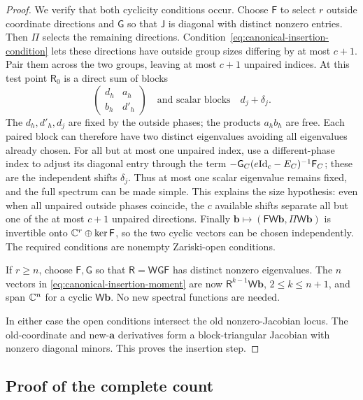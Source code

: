 \begin{proof}
We verify that both cyclicity conditions occur. Choose $\mathsf F$ to select
$r$ outside coordinate directions and $\mathsf G$ so that $\mathsf J$ is diagonal
with distinct nonzero entries. Then $\Pi$ selects the remaining
directions. Condition~\eqref{eq:canonical-insertion-condition} lets
these directions have outside group sizes differing by at most $c+1$.
Pair them across the two groups, leaving at most $c+1$ unpaired
indices. At this test point $\mathsf R_0$ is a direct sum of blocks
\[
 \begin{pmatrix}d_h&a_h\\b_h&d'_h\end{pmatrix}
 \quad\text{and scalar blocks}\quad d_j+\delta_j.
\]
The $d_h,d'_h,d_j$ are fixed by the outside phases; the products
$a_hb_h$ are free. Each paired block can therefore have two distinct
eigenvalues avoiding all eigenvalues already chosen. For all but at most one unpaired
index, use a different-phase index to adjust its diagonal entry
through the term $-\mathsf G_C(e\mathrm{Id}_c-E_C)^{-1}\mathsf F_C$;
these are the independent shifts $\delta_j$. Thus at most one scalar
eigenvalue remains fixed, and the full spectrum can be made simple.
This explains the size hypothesis: even when all unpaired outside
phases coincide, the $c$ available shifts separate all but one of
the at most $c+1$ unpaired directions.
Finally $\boldsymbol b\mapsto(\mathsf F\mathsf W \boldsymbol b,\Pi\mathsf W \boldsymbol b)$ is invertible onto
$\mathbb C^r\oplus\ker \mathsf F$, so the two cyclic vectors can be chosen
independently. The required conditions are nonempty Zariski-open
conditions.

If $r\geq n$, choose $\mathsf F,\mathsf G$ so that $\mathsf R=\mathsf W \mathsf G \mathsf F$ has distinct
nonzero eigenvalues. The $n$ vectors in
\cref{eq:canonical-insertion-moment} are now
$\mathsf R^{k-1}\mathsf W \boldsymbol b$, $2\leq k\leq n+1$, and span $\mathbb C^n$ for a
cyclic $\mathsf W \boldsymbol b$. No new spectral functions are needed.

In either case the open conditions intersect the old nonzero-Jacobian
locus. The old-coordinate and new-$\boldsymbol a$ derivatives form a block-triangular
Jacobian with nonzero diagonal minors. This proves the insertion step.
\end{proof}

\subsection{Proof of the complete count}

